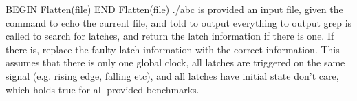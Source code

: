 \documentclass[12pt,final,oneside]{article} %
\begin{document}
      BEGIN Flatten(file)
      END Flatten(file)
./abc is provided an input file, given the command to echo the current file,
and told to output everything to output
grep is called to search for latches, and return the latch information if
there is one. If there is, replace the faulty latch information with the
correct information.
This assumes that there is only one global clock, all latches are triggered on
the same signal (e.g. rising edge, falling etc), and all latches have initial
state don't care, which holds true for all provided benchmarks.
\end{document}
